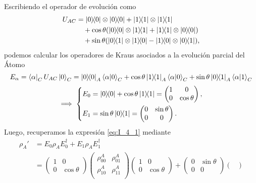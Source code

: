 \documentclass{scrartcl}
\DeclareRobustCommand{\[}{\begin{equation}}
\DeclareRobustCommand{\]}{\end{equation}}
\begin{document}
\begin{enumerate}
    Escribiendo el operador de evolución como
    \begin{align}
        U_{AC} &= \dyad{0}{0} \otimes \dyad{0}{0} + \dyad{1}{1} \otimes \dyad{1}{1} \\
            &\quad + \cos\theta (\dyad{0}{0} \otimes \dyad{1}{1} + \dyad{1}{1} \otimes \dyad{0}{0}) \\
            &\quad + \sin\theta (\dyad{0}{1} \otimes \dyad{1}{0} - \dyad{1}{0} \otimes \dyad{0}{1}),
    \end{align}
    podemos calcular los operadores de Kraus asociados a la evolución parcial del Átomo
    \[ E_\alpha = \bra{\alpha}_C U_{AC} \ket{0}_C = \dyad{0}{0}_A \ip{\alpha}{0}_C + \cos\theta \dyad{1}{1}_A \ip{\alpha}{0}_C + \sin\theta \dyad{0}{1}_A \ip{\alpha}{1}_C \]
    \[
        \implies
        \begin{dcases}
            E_0 = \dyad{0}{0} + \cos\theta \dyad{1}{1} = \begin{pmatrix} 1 & 0 \\ 0 & \cos\theta \end{pmatrix}, \\
            E_1 = \sin\theta \dyad{0}{1} = \begin{pmatrix} 0 & \sin\theta \\ 0 & 0 \end{pmatrix}.
        \end{dcases}
    \]
    Luego, recuperamos la expresión \eqref{eq:I_4_1} mediante
    \begin{align}
        \rho_A' &= E_0 \rho_A E_0^\dagger + E_1 \rho_A E_1^\dagger \\
            &= \begin{pmatrix} 1 & 0 \\ 0 & \cos\theta \end{pmatrix} 
            \begin{pmatrix}
                \rho^A_{00} & \rho^A_{01} \\
                \rho^A_{10} & \rho^A_{11} \\
            \end{pmatrix}
            \begin{pmatrix} 1 & 0 \\ 0 & \cos\theta \end{pmatrix}
            +
            \begin{pmatrix} 0 & \sin\theta \\ 0 & 0 \end{pmatrix}
            \begin{pmatrix}

\end{pmatrix}
\end{align}
\end{enumerate}
\end{document}

